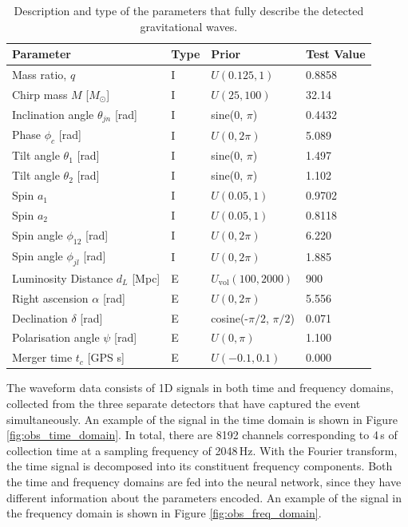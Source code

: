 \begin{table}[htb]
\centering
\begin{tabular}{|l|l|l|l|}
\hline
\textbf{Parameter} & \textbf{Type} & \textbf{Prior} & \textbf{Test Value} \\
\hline
Mass ratio, \( q \) & I & \( U(0.125, 1) \) & 0.8858 \\
Chirp mass \( M \) [\( M_{\odot} \)] & I & \( U(25, 100) \) & 32.14 \\
Inclination angle \( \theta_{jn} \) [rad] & I & sine(0, \( \pi \)) & 0.4432 \\
Phase \( \phi_c \) [rad] & I & \( U(0, 2\pi) \) & 5.089 \\
Tilt angle \( \theta_1 \) [rad] & I & sine(0, \( \pi \)) & 1.497 \\
Tilt angle \( \theta_2 \) [rad] & I & sine(0, \( \pi \)) & 1.102 \\
Spin \( a_1 \) & I & \( U(0.05, 1) \) & 0.9702 \\
Spin \( a_2 \) & I & \( U(0.05, 1) \) & 0.8118 \\
Spin angle \( \phi_{12} \) [rad] & I & \( U(0, 2\pi) \) & 6.220 \\
Spin angle \( \phi_{jl} \) [rad] & I & \( U(0, 2\pi) \) & 1.885 \\
Luminosity Distance \( d_L \) [Mpc] & E & \( U_{\text{vol}}(100, 2000) \) & 900 \\
Right ascension \( \alpha \) [rad] & E & \( U(0, 2\pi) \) & 5.556 \\
Declination \( \delta \) [rad] & E & cosine(-\( \pi/2 \), \( \pi/2 \)) & 0.071 \\
Polarisation angle \( \psi \) [rad] & E & \( U(0, \pi) \) & 1.100 \\
Merger time \( t_c \) [GPS s] & E & \( U(-0.1, 0.1) \) & 0.000 \\
\hline
\end{tabular}
\caption{Description and type of the parameters that fully describe the detected gravitational waves.}
\label{tab:gw_parameters}
\end{table}

The waveform data consists of 1D signals in both time and frequency domains, collected from the three separate detectors that have captured the event simultaneously. An example of the signal in the time domain is shown in Figure \ref{fig:obs_time_domain}. In total, there are 8192 channels corresponding to 4\,s of collection time at a sampling frequency of 2048\,Hz. With the Fourier transform, the time signal is decomposed into its constituent frequency components. Both the time and frequency domains are fed into the neural network, since they have different information about the parameters encoded. An example of the signal in the frequency domain is shown in Figure \ref{fig:obs_freq_domain}.

